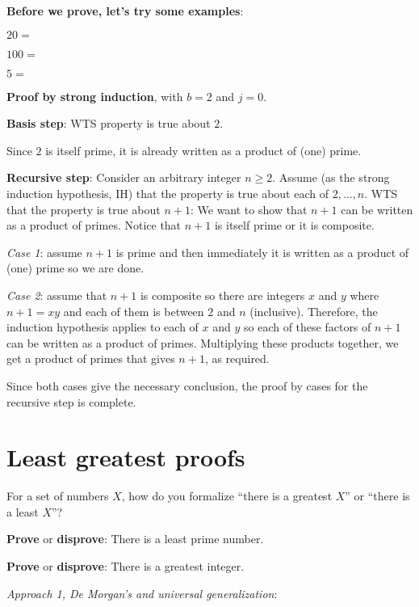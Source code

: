 \documentclass[12pt, oneside]{article}
\begin{document}
{\bf Before we prove, let's try some examples}:

$20 = $

$100 = $

$5 = $


{\bf Proof by strong induction}, with $b=2$ and $j=0$.

{\bf Basis step}:  WTS property is true about  $2$.

Since $2$ is itself prime,
it is already written as a product of (one) prime.


{\bf Recursive step}: Consider an arbitrary integer $n \geq 2$.
Assume (as the strong induction hypothesis, IH) that the property is true about  each of $2, \ldots, n$.  
WTS that the property is true about  $n+1$: We want to show that $n+1$ can be written 
as a product of primes.  Notice that $n+1$ is itself prime or it is composite.

{\it Case 1}: assume $n+1$ is prime and then immediately it is written as a product
of (one) prime so we are done.  

{\it Case 2}: assume that $n+1$ is composite
so there are integers $x$ and $y$ where $n+1 = xy$ and each of them is between $2$ and $n$
(inclusive).  Therefore, the induction hypothesis applies to each of $x$ and $y$ so each 
of these factors of $n+1$ can be written as a product of primes.  Multiplying these products together, 
we get a product of primes that gives $n+1$, as required. 

Since both cases give the necessary
conclusion, the proof by cases for the recursive step is complete. \vfill
\section*{Least greatest proofs}


For a set of numbers $X$, how do you formalize ``there is a greatest $X$'' 
or ``there is a least $X$''?

\vspace{30pt}

{\bf Prove} or {\bf  disprove}:  There is a least prime number.

\vspace{100pt}

{\bf Prove} or {\bf  disprove}: There is a greatest integer. 

{\it Approach 1, De Morgan's and universal generalization}: 

\vspace{100pt}
\end{document}
